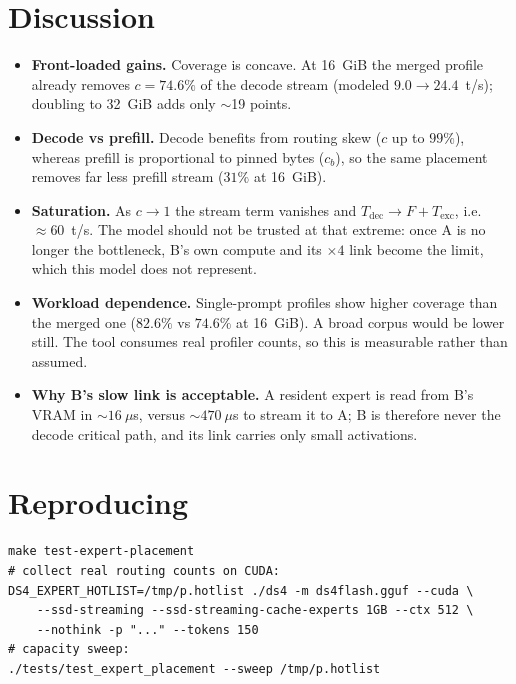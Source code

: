 \documentclass[11pt]{article}
\begin{document}
\section{Discussion}

\begin{itemize}
\item \textbf{Front-loaded gains.} Coverage is concave. At 16~GiB the merged
profile already removes $c=74.6\%$ of the decode stream (modeled $9.0\to
24.4$~t/s); doubling to 32~GiB adds only $\sim$19 points.
\item \textbf{Decode vs prefill.} Decode benefits from routing skew ($c$ up
to $99\%$), whereas prefill is proportional to pinned bytes ($c_b$), so the
same placement removes far less prefill stream ($31\%$ at 16~GiB).
\item \textbf{Saturation.} As $c\to 1$ the stream term vanishes and
$T_{\text{dec}}\to F+T_{\text{exc}}$, i.e.\ $\approx 60$~t/s. The model
should not be trusted at that extreme: once A is no longer the bottleneck,
B's own compute and its $\times4$ link become the limit, which this model
does not represent.
\item \textbf{Workload dependence.} Single-prompt profiles show higher
coverage than the merged one ($82.6\%$ vs $74.6\%$ at 16~GiB). A broad corpus
would be lower still. The tool consumes real profiler counts, so this is
measurable rather than assumed.
\item \textbf{Why B's slow link is acceptable.} A resident expert is read
from B's VRAM in $\sim$$16\ \mu$s, versus $\sim$$470\ \mu$s to stream it to A;
B is therefore never the decode critical path, and its link carries only
small activations.
\end{itemize}

\section{Reproducing}

\begin{verbatim}
make test-expert-placement
# collect real routing counts on CUDA:
DS4_EXPERT_HOTLIST=/tmp/p.hotlist ./ds4 -m ds4flash.gguf --cuda \
    --ssd-streaming --ssd-streaming-cache-experts 1GB --ctx 512 \
    --nothink -p "..." --tokens 150
# capacity sweep:
./tests/test_expert_placement --sweep /tmp/p.hotlist
\end{verbatim}
\end{document}
